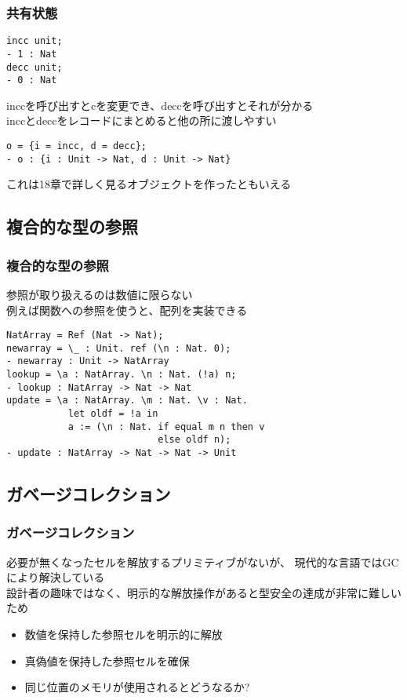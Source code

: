\documentclass[dvipdfmx,cjk,xcolor=dvipsnames,envcountsect,notheorems]{beamer}
\theoremstyle{definition}
\begin{document}
\begin{frame}[fragile]
	\frametitle{共有状態}
	\Large
\begin{lstlisting}
incc unit;
- 1 : Nat
decc unit;
- 0 : Nat
\end{lstlisting}
	inccを呼び出すとcを変更でき、deccを呼び出すとそれが分かる\\
	inccとdeccをレコードにまとめると他の所に渡しやすい
\begin{lstlisting}
o = {i = incc, d = decc};
- o : {i : Unit -> Nat, d : Unit -> Nat}
\end{lstlisting}
	これは18章で詳しく見るオブジェクトを作ったともいえる
\end{frame}

\subsection{複合的な型の参照}

\begin{frame}[fragile]
	\frametitle{複合的な型の参照}
	\Large 参照が取り扱えるのは数値に限らない\\
	例えば関数への参照を使うと、配列を実装できる
\begin{lstlisting}
NatArray = Ref (Nat -> Nat);
newarray = \_ : Unit. ref (\n : Nat. 0);
- newarray : Unit -> NatArray
lookup = \a : NatArray. \n : Nat. (!a) n;
- lookup : NatArray -> Nat -> Nat
update = \a : NatArray. \m : Nat. \v : Nat.
           let oldf = !a in
           a := (\n : Nat. if equal m n then v
                           else oldf n);
- update : NatArray -> Nat -> Nat -> Unit
\end{lstlisting}
\end{frame}

\subsection{ガベージコレクション}

\begin{frame}
	\frametitle{ガベージコレクション}
	\Large 必要が無くなったセルを解放するプリミティブがないが、
	現代的な言語ではGCにより解決している\\
	設計者の趣味ではなく、明示的な解放操作があると型安全の達成が非常に難しいため
	\vfill
	\begin{itemize}
		\item 数値を保持した参照セルを明示的に解放
		\item 真偽値を保持した参照セルを確保
		\item 同じ位置のメモリが使用されるとどうなるか?
	\end{itemize}
\end{frame}
\end{document}
